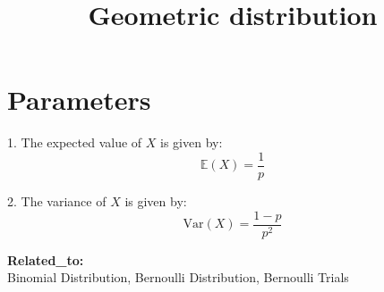 \documentclass{article}
\title{Geometric distribution}
\begin{document}
\maketitle

\section{Parameters}

1. The expected value of \( X \) is given by:
   \[
   \mathbb{E}(X) = \frac{1}{p}
   \]

2. The variance of \( X \) is given by:
   \[
   \text{Var}(X) = \frac{1 - p}{p^2}
   \]

\textbf{Related\_to:} \\
Binomial Distribution, Bernoulli Distribution, Bernoulli Trials
\end{document}
